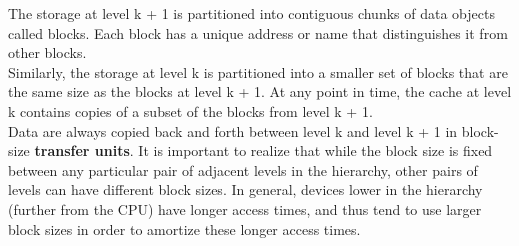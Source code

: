 \documentclass[11pt]{article}
\begin{document}
The storage at level k + 1 is partitioned into contiguous chunks of data objects called blocks. Each block has a unique address or name that distinguishes it from other blocks.\\

Similarly, the storage at level k is partitioned into a smaller set of blocks that are the same size as the blocks at level k + 1. At any point in time, the cache at level k contains copies of a subset of the blocks from level k + 1.\\


Data are always copied back and forth between level k and level k + 1 in block-size \textbf{transfer units}.  It is important to realize that while the block size is fixed between any particular pair of adjacent levels in the hierarchy, other pairs of levels can have different block sizes.  In general, devices lower in the hierarchy (further from the CPU) have longer access times, and thus tend to use larger block sizes in order to amortize these longer access times.\\
\end{document}
